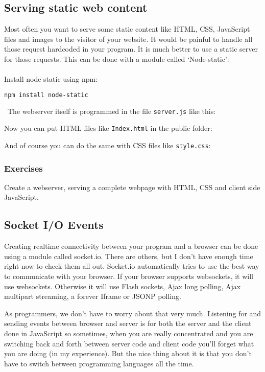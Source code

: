 \documentclass[a4paper]{report}
\begin{document}
\subsection*{Serving static web content} 
Most often you want to serve some static content like HTML, CSS, JavaScript files and images to the visitor of your website. It would be painful to handle all those request hardcoded in your program. It is much better to use a static server for those requests. This can be done with a module called `Node-static':\\ 
\\ 
\noindent Install node static using npm: 
\begin{lstlisting}[language=bash] 
npm install node-static 
\end{lstlisting} 
\noindent\ The webserver itself is programmed in the file \texttt{server.js} like this: 
 
 
\noindent Now you can put HTML files like \texttt{Index.html} in the public folder: 
 
 
\noindent And of course you can do the same with CSS files like \texttt{style.css}: 
 
 
\subsubsection*{Exercises} 
Create a webserver, serving a complete webpage with HTML, CSS and client side JavaScript. 
 
\subsection*{Socket I/O Events} 
Creating realtime connectivity between your program and a browser can be done using a module called socket.io. There are others, but I don't have enough time right now to check them all out. Socket.io automatically tries to use the best way to communicate with your browser. If your browser supports websockets, it will use websockets. Otherwise it will use Flash sockets, Ajax long polling, Ajax multipart streaming, a forever Iframe or JSONP polling. 
 
As programmers, we don't have to worry about that very much. Listening for and sending events between browser and server is for both the server and the client done in JavaScript so sometimes, when you are really concentrated and you are switching back and forth between server code and client code you'll forget what you are doing (in my experience). But the nice thing about it is that you don't have to switch between programming languages all the time. 
 
\end{document}
